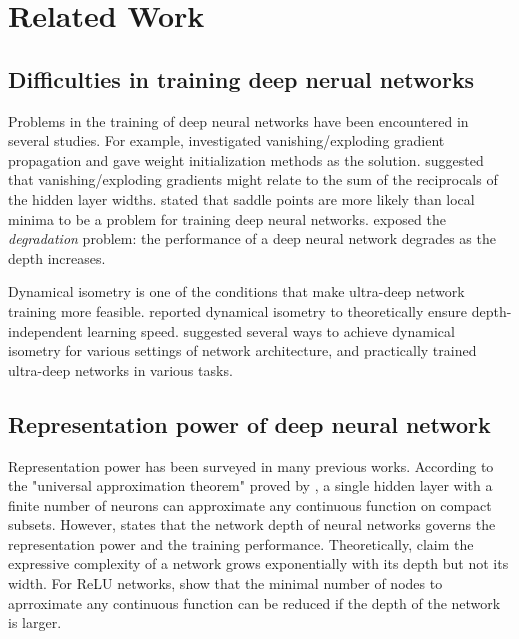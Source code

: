 \chapter{Related Work}
\label{related}

\section{Difficulties in training deep nerual networks}
\label{rel:difficulty}
Problems in the training of deep neural networks have been encountered in several studies.
For example, \cite{xavier, he} investigated vanishing/exploding gradient propagation and gave weight initialization methods as the solution. \cite{evop} suggested that vanishing/exploding gradients might relate to the sum of the reciprocals of the hidden layer widths.
\cite{opt_prob, saddle} stated that saddle points are more likely than local minima to be a problem for training deep neural networks.
\cite{degrade1, degrade2, resnet1} exposed the \textit{degradation} problem: the performance of a deep neural network degrades as the depth increases.

Dynamical isometry is one of the conditions that make ultra-deep network training more feasible.
\cite{mft:linear} reported dynamical isometry to theoretically ensure depth-independent learning speed.
\cite{mft:sigmoid, mft:spectral} suggested several ways to achieve dynamical isometry for various settings of network architecture, and \cite{mft:cnn, mft:rnn} practically trained ultra-deep networks in various tasks.

\section{Representation power of deep neural network}
\label{rel:representation}
Representation power has been surveyed in many previous works.
According to the "universal approximation theorem" proved by \cite{universal}, a single hidden layer
with a finite number of neurons can approximate any continuous function on compact subsets.
However, \cite{res_ensemble} states that the network depth of neural networks governs the 
representation power and the training performance.
Theoretically, \cite{mft:expo, expressive, linear_regions, expr_power} claim the expressive complexity of a network grows exponentially with 
its depth but not its width.
For ReLU networks, \cite{relu_understand, relu_benifit, relu_approx} show that the minimal number of
nodes to aprroximate any continuous function can be reduced if the depth of the network is larger.

